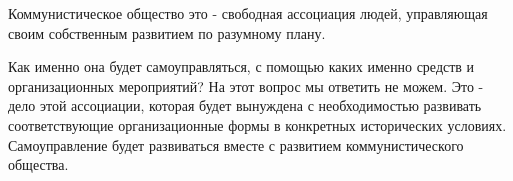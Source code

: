 \documentclass[../main]{subfiles}
\begin{document}
Коммунистическое общество это - свободная ассоциация людей, управляющая своим собственным развитием по разумному плану.

Как именно она будет самоуправляться, с помощью каких именно средств и организационных мероприятий? На этот вопрос мы ответить не можем. Это - дело этой ассоциации, которая будет вынуждена с необходимостью развивать соответствующие организационные формы в конкретных исторических условиях. Самоуправление будет развиваться вместе с развитием коммунистического общества.
\end{document}
